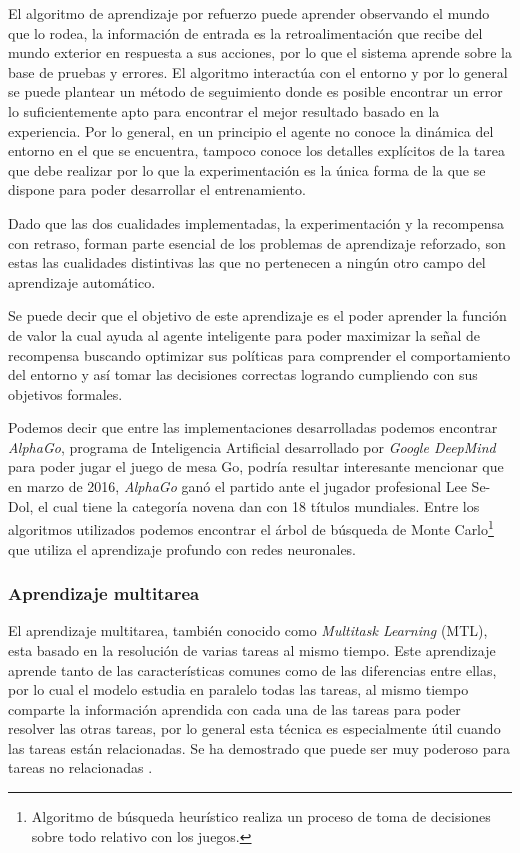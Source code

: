 El algoritmo de aprendizaje por refuerzo puede aprender observando el mundo que lo rodea, la información de entrada es la retroalimentación que recibe del mundo exterior en respuesta a sus acciones, por lo que el sistema aprende sobre la base de pruebas y errores. El algoritmo interactúa con el entorno y por lo general se puede plantear un método de seguimiento donde es posible encontrar un error lo suficientemente apto para encontrar el mejor resultado basado en la experiencia. Por lo general, en un principio el agente no conoce la dinámica del entorno en el que se encuentra, tampoco conoce los detalles explícitos de la tarea que debe realizar por lo que la experimentación es la única forma de la que se dispone para poder desarrollar el entrenamiento.

Dado que las dos cualidades implementadas, la experimentación y la recompensa con retraso, forman parte esencial de los problemas de aprendizaje reforzado, son estas las cualidades distintivas las que no pertenecen a ningún otro campo del aprendizaje automático.

Se puede decir que el objetivo de este aprendizaje es el poder aprender la función de valor la cual ayuda al agente inteligente para poder maximizar la señal de recompensa buscando optimizar sus políticas para comprender el comportamiento del entorno y así tomar las decisiones correctas logrando cumpliendo con sus objetivos formales. 

Podemos decir que entre las implementaciones desarrolladas podemos encontrar \textit{AlphaGo}, programa de Inteligencia Artificial desarrollado por \textit{Google DeepMind} para poder jugar el juego de mesa Go, podría resultar interesante mencionar que en marzo de 2016, \textit{AlphaGo} ganó el partido ante el jugador profesional Lee Se-Dol, el cual tiene la categoría novena dan con 18 títulos mundiales. Entre los algoritmos utilizados podemos encontrar el árbol de búsqueda de Monte Carlo\footnote{Algoritmo de búsqueda heurístico realiza un proceso de toma de decisiones sobre todo relativo con los juegos.} que utiliza el aprendizaje profundo con redes neuronales.

\subsubsection{Aprendizaje multitarea}

El aprendizaje multitarea, también conocido como \textit{Multitask Learning} (MTL), esta basado en la resolución de varias tareas al mismo tiempo. Este aprendizaje aprende tanto de las características comunes como de las diferencias entre ellas, por lo cual el modelo estudia en paralelo todas las tareas, al mismo tiempo comparte la información aprendida con cada una de las tareas para poder resolver las otras  tareas, por lo general esta técnica es especialmente útil cuando las tareas están relacionadas. Se ha demostrado que puede ser muy poderoso para tareas no relacionadas \cite{CerdaMunoz2021Feb}.

